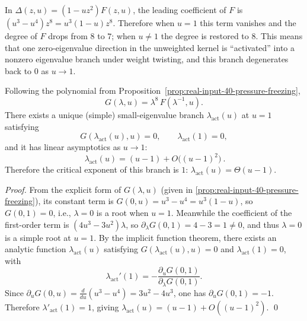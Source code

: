 \begin{remark}\label{rem:real-input-40-zero-activation}
In $\Delta(z,u)=(1-uz^2)F(z,u)$, the leading coefficient of $F$ is $(u^3-u^4)z^8=u^3(1-u)z^8$. Therefore when $u=1$ this term vanishes and the degree of $F$ drops from $8$ to $7$; when $u\neq 1$ the degree is restored to $8$. This means that one zero-eigenvalue direction in the unweighted kernel is ``activated'' into a nonzero eigenvalue branch under weight twisting, and this branch degenerates back to $0$ as $u\to 1$.
\end{remark}

\begin{proposition}\label{prop:real-input-40-activated-branch-linear}
Following the polynomial from Proposition~\ref{prop:real-input-40-pressure-freezing},
\[
G(\lambda,u)=\lambda^8\,F(\lambda^{-1},u).
\]
There exists a unique (simple) small-eigenvalue branch \(\lambda_{\mathrm{act}}(u)\) at \(u=1\) satisfying
\[
G(\lambda_{\mathrm{act}}(u),u)=0,\qquad \lambda_{\mathrm{act}}(1)=0,
\]
and it has linear asymptotics as \(u\to 1\):
\[
\boxed{\ \lambda_{\mathrm{act}}(u)=(u-1)+O\!\bigl((u-1)^2\bigr)\ }.
\]
Therefore the critical exponent of this branch is \(1\): \(\lambda_{\mathrm{act}}(u)=\Theta(u-1)\).
\end{proposition}
\begin{proof}
From the explicit form of \(G(\lambda,u)\) (given in \eqref{prop:real-input-40-pressure-freezing}), its constant term is
\(
G(0,u)=u^3-u^4=u^3(1-u)
\), so \(G(0,1)=0\), i.e., \(\lambda=0\) is a root when \(u=1\).
Meanwhile the coefficient of the first-order term is \((4u^3-3u^2)\lambda\), so
\(
\partial_\lambda G(0,1)=4-3=1\neq 0
\), and thus \(\lambda=0\) is a simple root at \(u=1\).
By the implicit function theorem, there exists an analytic function \(\lambda_{\mathrm{act}}(u)\) satisfying \(G(\lambda_{\mathrm{act}}(u),u)=0\) and \(\lambda_{\mathrm{act}}(1)=0\), with
\[
\lambda_{\mathrm{act}}'(1)=-\frac{\partial_u G(0,1)}{\partial_\lambda G(0,1)}.
\]
Since \(\partial_u G(0,u)=\frac{d}{du}(u^3-u^4)=3u^2-4u^3\), one has \(\partial_u G(0,1)=-1\). Therefore \(\lambda'_{\mathrm{act}}(1)=1\), giving
\(
\lambda_{\mathrm{act}}(u)=(u-1)+O((u-1)^2)
\).
\qed
\end{proof}



